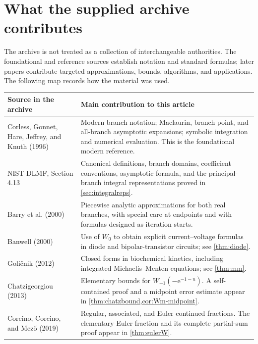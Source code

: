 \documentclass[11pt]{article}
\theoremstyle{remark}
\newcommand{\ee}{\mathrm e}
\begin{document}
\section{What the supplied archive contributes}\label{sec:archive}

The archive is not treated as a collection of interchangeable authorities.
The foundational and reference sources establish notation and standard
formulas; later papers contribute targeted approximations, bounds,
algorithms, and applications.  The following map records how the material
was used.

\begin{longtable}{@{}>{\raggedright\arraybackslash}p{}>{\raggedright\arraybackslash}p{}@{}}
\toprule
Source in the archive & Main contribution to this article\\
\midrule
\endhead
Corless, Gonnet, Hare, Jeffrey, and Knuth (1996)~\cite{corless1996} &
Modern branch notation; Maclaurin, branch-point, and all-branch asymptotic
expansions; symbolic integration and numerical evaluation.  This is the
foundational modern reference.\\
\addlinespace
NIST DLMF, Section 4.13~\cite{dlmf} &
Canonical definitions, branch domains, coefficient conventions, asymptotic
formula, and the principal-branch integral representations proved in
\cref{sec:integralreps}.\\
\addlinespace
Barry et al. (2000)~\cite{barry2000} &
Piecewise analytic approximations for both real branches, with special care
at endpoints and with formulas designed as iteration starts.\\
\addlinespace
Banwell (2000)~\cite{banwell2000} &
Use of \(W_0\) to obtain explicit current--voltage formulas in diode and
bipolar-transistor circuits; see \cref{thm:diode}.\\
\addlinespace
Goli\v{c}nik (2012)~\cite{golicnik2012} &
Closed forms in biochemical kinetics, including integrated
Michaelis--Menten equations; see \cref{thm:mm}.\\
\addlinespace
Chatzigeorgiou (2013)~\cite{chatzigeorgiou2013} &
Elementary bounds for \(W_{-1}(-\ee^{-1-u})\).  A self-contained proof and
a midpoint error estimate appear in
\cref{thm:chatzbound,cor:Wm-midpoint}.\\
\addlinespace
Corcino, Corcino, and Mez\H{o} (2019)~\cite{corcino2019} &
Regular, associated, and Euler continued fractions.  The elementary Euler
fraction and its complete partial-sum proof appear in
\cref{thm:eulerW}.\\

\end{longtable}
\end{document}
